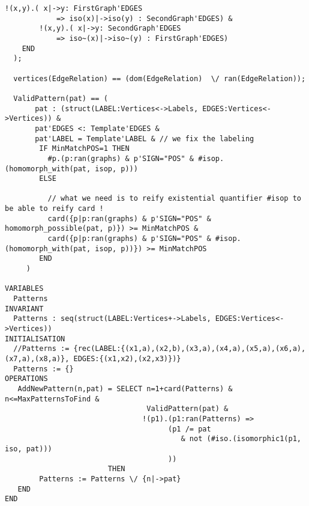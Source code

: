 \begin{lstlisting}[caption=ProB frequent graph mining model (only positive examples), style=model]
		!(x,y).( x|->y: FirstGraph'EDGES
			=> iso(x)|->iso(y) : SecondGraph'EDGES) &
		!(x,y).( x|->y: SecondGraph'EDGES
			=> iso~(x)|->iso~(y) : FirstGraph'EDGES)
    END
  );
  
  vertices(EdgeRelation) == (dom(EdgeRelation)  \/ ran(EdgeRelation));
  
  ValidPattern(pat) == (
       pat : (struct(LABEL:Vertices<->Labels, EDGES:Vertices<->Vertices)) &
       pat'EDGES <: Template'EDGES &
       pat'LABEL = Template'LABEL & // we fix the labeling
        IF MinMatchPOS=1 THEN
          #p.(p:ran(graphs) & p'SIGN="POS" & #isop.(homomorph_with(pat, isop, p))) 
        ELSE 
       
          // what we need is to reify existential quantifier #isop to be able to reify card !
          card({p|p:ran(graphs) & p'SIGN="POS" & homomorph_possible(pat, p)}) >= MinMatchPOS &
          card({p|p:ran(graphs) & p'SIGN="POS" & #isop.(homomorph_with(pat, isop, p))}) >= MinMatchPOS
        END 
     )

VARIABLES
  Patterns
INVARIANT
  Patterns : seq(struct(LABEL:Vertices+->Labels, EDGES:Vertices<->Vertices))
INITIALISATION
  //Patterns := {rec(LABEL:{(x1,a),(x2,b),(x3,a),(x4,a),(x5,a),(x6,a),(x7,a),(x8,a)}, EDGES:{(x1,x2),(x2,x3)})}
  Patterns := {}
OPERATIONS
   AddNewPattern(n,pat) = SELECT n=1+card(Patterns) & n<=MaxPatternsToFind & 
                                 ValidPattern(pat) &
                                !(p1).(p1:ran(Patterns) =>
                                      (p1 /= pat
                                         & not (#iso.(isomorphic1(p1, iso, pat)))
                                      ))
                        THEN
        Patterns := Patterns \/ {n|->pat}
   END
END
\end{lstlisting}

